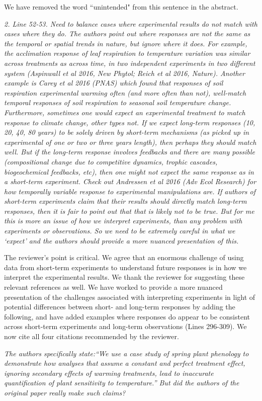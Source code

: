 \documentclass[11pt,a4paper]{letter}
\begin{document}
\begin{letter}{}
\par We have removed the word ``unintended"  from this sentence in the abstract.
\\

\par \emph{2. Line 52-53. Need to balance cases where experimental results do not match with cases where they do. The authors point out where responses are not the same as the temporal or spatial trends in nature, but ignore where it does. For example, the acclimation response of leaf respiration to temperature variation was similar across treatments as across time, in two independent experiments in two different system (Aspinwall et al 2016, New Phytol; Reich et al 2016, Nature). Another example is Carey et al 2016 (PNAS) which found that responses of soil respiration experimental warming often (and more often than not), well-match temporal responses of soil respiration to seasonal soil temperature change. Furthermore, sometimes one would expect an experimental treatment to match response to climate change, other types not. If we expect long-term responses (10, 20, 40, 80 years) to be solely driven by short-term mechanisms (as picked up in experimental of one or two or three years length), then perhaps they should match well. But if the long-term response involves feedbacks and there are many possible (compositional change due to competitive dynamics, trophic cascades, biogeochemical feedbacks, etc), then one might not expect the same response as in a short-term experiment. Check out Andressen et al 2016 (Adv Ecol Research) for how temporally variable response to experimental manipulations are. If authors of short-term
experiments claim that their results should directly match long-term responses, then it is fair to point out that that is likely not to be true. But for me this is more an issue of how we interpret experiments, than any problem with experiments or observations. So we need to be extremely careful in what we `expect' and the authors should provide a more nuanced presentation of this.}

\par The reviewer's point is critical. We agree that an enormous challenge of using data from short-term experiments to understand future responses is in how we interpret the experimental results. We thank the reviewer for suggesting these relevant references as well. We have worked to provide a more nuanced presentation of the challenges associated with interpreting experiments in light of potential differences between short- and long-term responses by adding the following, and have added examples where responses do appear to be consistent across short-term experiments and long-term observations (Lines 296-309). We now cite all four citations recommended by the reviewer. 
\\
\par \emph{The authors specifically state:``We use a case study of spring plant phenology to demonstrate how analyses that assume a constant and perfect treatment effect, ignoring secondary effects of warming treatments, lead to inaccurate quantification of plant sensitivity to temperature.'' But did the authors of the original paper really make such claims?}


\end{letter}
\end{document}
